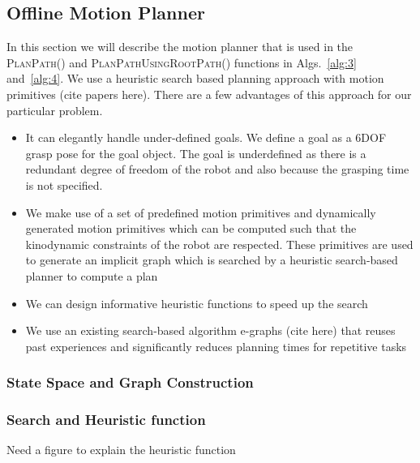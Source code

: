 \subsection{Offline Motion Planner}
In this section we will describe the motion planner that is used in the \textsc{PlanPath()} and \textsc{PlanPathUsingRootPath()} functions in Algs.~\ref{alg:3} and~\ref{alg:4}. We use a heuristic search based planning approach with motion primitives (cite papers here). There are a few advantages of this approach for our particular problem.
\begin{itemize}
    \item It can elegantly handle under-defined goals. We define a goal as a 6DOF grasp pose for the goal object. The goal is underdefined as there is a redundant degree of freedom of the robot and also because the grasping time is not specified.
    \item We make use of a set of predefined motion primitives and dynamically generated motion primitives which can be computed such that the kinodynamic constraints of the robot are respected. These primitives are used to generate an implicit graph which is searched by a heuristic search-based planner to compute a plan
    \item We can design informative heuristic functions to speed up the search
    \item We use an existing search-based algorithm e-graphs (cite here) that reuses past experiences and significantly reduces planning times for repetitive tasks
\end{itemize}


\subsubsection{State Space and Graph Construction}
\subsubsection{Search and Heuristic function}
{\color{blue} Need a figure to explain the heuristic function}
